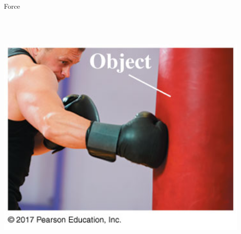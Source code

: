 \documentclass{beamer}
\begin{document}
\begin{frame}{Force}
\begin{columns}
\begin{column}{0.4\textwidth}
\begin{center}
   \\~\\
   \includegraphics[width=0.95\textwidth]{../figures/05_Pg111_UnFigure2.jpg}
\end{center}
\end{column}
\end{columns}
\end{frame}
\end{document}
